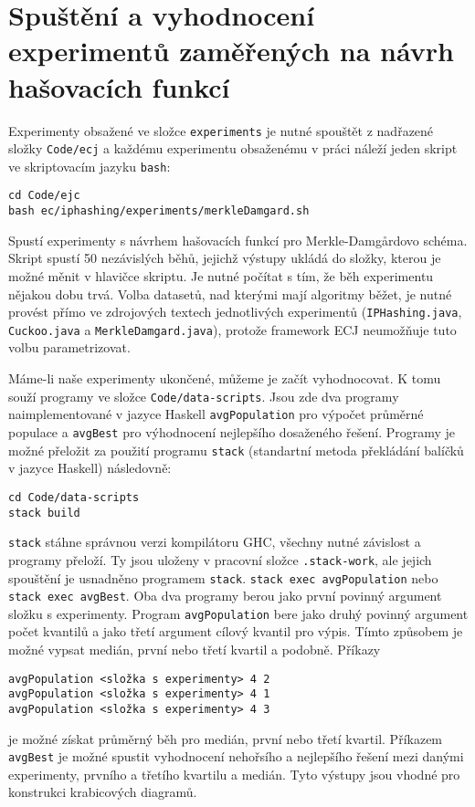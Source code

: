 \section{Spuštění a vyhodnocení experimentů zaměřených na návrh hašovacích funkcí}
Experimenty obsažené ve složce \texttt{experiments} je nutné spouštět z nadřazené složky \texttt{Code/ecj} a každému experimentu obsaženému
v práci náleží jeden skript ve skriptovacím jazyku \texttt{bash}:
\begin{verbatim}
cd Code/ejc
bash ec/iphashing/experiments/merkleDamgard.sh
\end{verbatim}
Spustí experimenty s návrhem hašovacích funkcí pro Merkle-Damg\r{a}rdovo schéma. Skript spustí 50 nezávislých běhů, jejichž výstupy ukládá do složky, kterou
je možné měnit v hlavičce skriptu. Je nutné počítat s tím, že běh experimentu nějakou dobu trvá. 
Volba datasetů, nad kterými mají algoritmy běžet, je nutné provést přímo ve zdrojových
textech jednotlivých experimentů (\texttt{IPHashing.java}, \texttt{Cuckoo.java} a \texttt{MerkleDamgard.java}), protože framework ECJ neumožňuje
tuto volbu parametrizovat.

Máme-li naše experimenty ukončené, můžeme je začít vyhodnocovat. K tomu souží programy ve složce \texttt{Code/data-scripts}. Jsou zde 
dva programy naimplementované v jazyce Haskell \texttt{avgPopulation} pro výpočet průměrné populace a \texttt{avgBest} pro výhodnocení
nejlepšího dosaženého řešení. Programy je možné přeložit za použití programu \texttt{stack} (standartní metoda překládání balíčků v jazyce
Haskell) následovně:
\begin{verbatim}
cd Code/data-scripts
stack build
\end{verbatim}
\texttt{stack} stáhne správnou verzi kompilátoru GHC, všechny nutné závislost a programy přeloží. Ty jsou uloženy v pracovní složce \texttt{.stack-work},
ale jejich spouštění je usnadněno programem \texttt{stack}. \texttt{stack exec avgPopulation} nebo \texttt{stack exec avgBest}. Oba dva programy berou
jako první povinný argument složku s experimenty. Program \texttt{avgPopulation} bere jako druhý povinný argument počet kvantilů a jako třetí argument
cílový kvantil pro výpis. Tímto způsobem je možné vypsat medián, první nebo třetí kvartil a podobně. Příkazy
\begin{verbatim}
avgPopulation <složka s experimenty> 4 2
avgPopulation <složka s experimenty> 4 1
avgPopulation <složka s experimenty> 4 3
\end{verbatim}
je možné získat průměrný běh pro medián, první nebo třetí kvartil. Příkazem \texttt{avgBest} je možné spustit vyhodnocení nehořsího a nejlepšího řešení
mezi danými experimenty, prvního a třetího kvartilu a medián. Tyto výstupy jsou vhodné pro konstrukci krabicových diagramů. 

